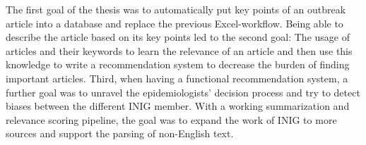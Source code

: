 The first goal of the thesis was to automatically put key points of an outbreak article into a database and replace the previous Excel-workflow. Being able to describe the article based on its key points led to the second goal: The usage of articles and their keywords to learn the relevance of an article and then use this knowledge to write a recommendation system to decrease the burden of finding important articles.
Third, when having a functional recommendation system, a further goal was to unravel the epidemiologists' decision process and try to detect biases between the different INIG member.
With a working summarization and relevance scoring pipeline, the goal was to expand the work of INIG to more sources and support the parsing of non-English text.
